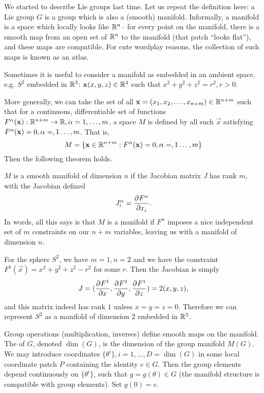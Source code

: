 We started to describe Lie groups last time. Let us repeat the definition here: a Lie group $G$ is a group which is also a (smooth) manifold. Informally, a manifold is a space which locally looks like $\RR^n$-- for every point on the manifold, there is a smooth map from an open set of $\RR^n$ to the manifold (that patch ``looks flat''), and these maps are compatible. For cute wordplay reasons, the collection of such maps is known as an atlas.

Sometimes it is useful to consider a manifold as embedded in an ambient space, e.g. $S^2$ embedded in $\RR^3$: $\vec{x}(x,y,z)\in \RR^3$ such that $x^2+y^2+z^2=r^2, r>0$.

More generally, we can take the set of all $\vec{x}=(x_1,x_2,\ldots,x_{n+m})\in \RR^{n+m}$ such that for a continuous, differentiable set of functions $F^\alpha(\vec{x}): \RR^{n+m}\to \RR, \alpha=1,\ldots,m$, a space $M$ is defined by all such $\vec{x}$ satisfying $F^\alpha(\vec{x})=0,\a=,1\ldots,m$. That is,
\begin{equation}
M=\set{\vec{x} \in \RR^{n+m} : F^\alpha(\vec{x})=0,\a=,1\ldots,m}
\end{equation} Then the following theorem holds.

\begin{thm}\label{manifoldcondition}
$M$ is a smooth manifold of dimension $n$ if the Jacobian matrix $J$ has rank $m$, with the Jacobian defined
$$J^\alpha_i =\P{F^\alpha}{x_i}.$$
In words, all this says is that $M$ is a manifold if $F^\alpha$ imposes a nice independent set of $m$ constraints on our $n+m$ variables, leaving us with a manifold of dimension $n$.
\end{thm}

\begin{exm}
For the sphere $S^2$, we have $m=1,n=2$ and we have the constraint $F^1(\vec{x})=x^2+y^2+z^2-r^2$ for some $r$. Then the Jacobian is simply $$J=(\P{F^1}{x},\P{F^1}{y},\P{F^1}{z})=2(x,y,z),$$ and this matrix indeed has rank $1$ unless $x=y=z=0$. Therefore we can represent $S^2$ as a manifold of dimension $2$ embedded in $\RR^3$.
\end{exm}

Group operations (multiplication, inverses) define smooth maps on the manifold. The  of $G$, denoted $\dim(G)$, is the dimension of the group manifold $M(G)$. We may introduce coordinates $\{\theta^i\}, i=1,\ldots, D=\dim(G)$ in some local coordinate patch $P$ containing the identity $e\in G$. Then the group elements depend continuously on $\{\theta^i\}$, such that $g=g(\theta)\in G$ (the manifold structure is compatible with group elements). Set $g(0)=e$. 

